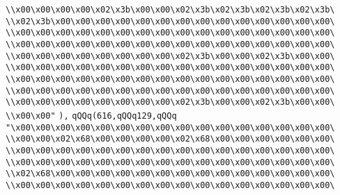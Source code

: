 \verb|\\x00\x00\x00\x00\x02\x3b\x00\x00\x02\x3b\x02\x3b\x02\x3b\x02\x3b\|\newline
\verb|\\x02\x3b\x00\x00\x00\x00\x00\x00\x00\x00\x00\x00\x00\x00\x00\x00\|\newline
\verb|\\x00\x00\x00\x00\x00\x00\x00\x00\x00\x00\x00\x00\x00\x00\x00\x00\|\newline
\verb|\\x00\x00\x00\x00\x00\x00\x00\x00\x00\x00\x00\x00\x00\x00\x00\x00\|\newline
\verb|\\x00\x00\x00\x00\x00\x00\x00\x00\x02\x3b\x00\x00\x02\x3b\x00\x00\|\newline
\verb|\\x00\x00\x00\x00\x00\x00\x00\x00\x00\x00\x00\x00\x00\x00\x00\x00\|\newline
\verb|\\x00\x00\x00\x00\x00\x00\x00\x00\x00\x00\x00\x00\x00\x00\x00\x00\|\newline
\verb|\\x00\x00\x00\x00\x00\x00\x00\x00\x00\x00\x00\x00\x00\x00\x00\x00\|\newline
\verb|\\x00\x00\x00\x00\x00\x00\x00\x00\x02\x3b\x00\x00\x02\x3b\x00\x00\|\newline
\verb|\\x00\x00"|\newline
\verb|),|\newline
\verb|qQQq(616,qQQq129,qQQq|\newline
\verb|"\x00\x00\x00\x00\x00\x00\x00\x00\x00\x00\x00\x00\x00\x00\x00\x00\|\newline
\verb|\\x00\x00\x02\x68\x00\x00\x00\x00\x02\x68\x00\x00\x00\x00\x00\x00\|\newline
\verb|\\x00\x00\x00\x00\x00\x00\x00\x00\x00\x00\x00\x00\x00\x00\x00\x00\|\newline
\verb|\\x00\x00\x00\x00\x00\x00\x00\x00\x00\x00\x00\x00\x00\x00\x00\x00\|\newline
\verb|\\x02\x68\x00\x00\x00\x00\x00\x00\x00\x00\x00\x00\x00\x00\x00\x00\|\newline
\verb|\\x00\x00\x00\x00\x00\x00\x00\x00\x00\x00\x00\x00\x00\x00\x00\x00\|\newline

